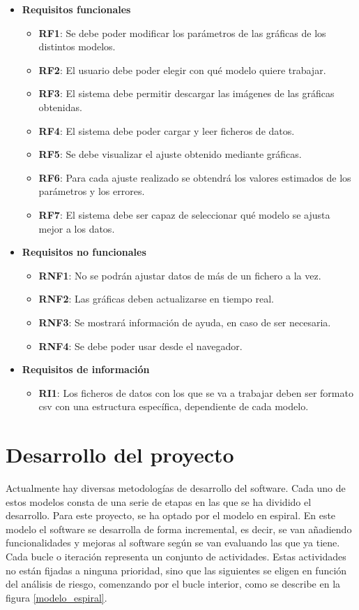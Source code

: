 \begin{itemize}
\item \textbf{Requisitos funcionales}
	\begin{itemize}
	\item \textbf{RF1}: Se debe poder modificar los parámetros de las gráficas de los distintos modelos.
	\item \textbf{RF2}: El usuario debe poder elegir con qué modelo quiere trabajar.
	\item \textbf{RF3}: El sistema debe permitir descargar las imágenes de las gráficas obtenidas.
	\item \textbf{RF4}: El sistema debe poder cargar y leer ficheros de datos.
	\item \textbf{RF5}: Se debe visualizar el ajuste obtenido mediante gráficas.
	\item \textbf{RF6}: Para cada ajuste realizado se obtendrá los valores estimados de los parámetros y los errores.
	\item \textbf{RF7}: El sistema debe ser capaz de seleccionar qué modelo se ajusta mejor a los datos. 
	\end{itemize}
\item \textbf{Requisitos no funcionales}
	\begin{itemize}
	\item \textbf{RNF1}: No se podrán ajustar datos de más de un fichero a la vez.
	\item \textbf{RNF2}: Las gráficas deben actualizarse en tiempo real.
	\item \textbf{RNF3}: Se mostrará información de ayuda, en caso de ser necesaria.
	\item \textbf{RNF4}: Se debe poder usar desde el navegador.
	\end{itemize}
\item \textbf{Requisitos de información}
	\begin{itemize}
	\item \textbf{RI1}: Los ficheros de datos con los que se va a trabajar deben ser formato csv con una estructura específica, dependiente de cada modelo.
	\end{itemize}
\end{itemize}

\section{Desarrollo del proyecto}

Actualmente hay diversas metodologías de desarrollo del software. Cada uno de estos modelos consta de una serie de etapas en las que se ha dividido el desarrollo. Para este proyecto, se ha optado por el modelo en espiral. En este modelo el software se desarrolla de forma incremental, es decir, se van añadiendo funcionalidades y mejoras al software según se van evaluando las que ya tiene. Cada bucle o iteración representa un conjunto de actividades. Estas actividades no están fijadas a ninguna prioridad, sino que las siguientes se eligen en función del análisis de riesgo, comenzando por el bucle interior, como se describe en la figura \ref{modelo_espiral}.

